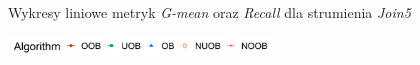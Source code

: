 \begin{figure}[h]
    \centering
    \qquad
    \caption{Wykresy liniowe metryk \textit{G-mean} oraz \textit{Recall} dla strumienia \textit{Join5}}\label{Figure:Join5}
\end{figure}

\begin{figure}[h]
    \centering
    \includegraphics[width=7cm]{figures/algorithms_legend.JPG}
\end{figure}

\vspace{-1.2cm}

